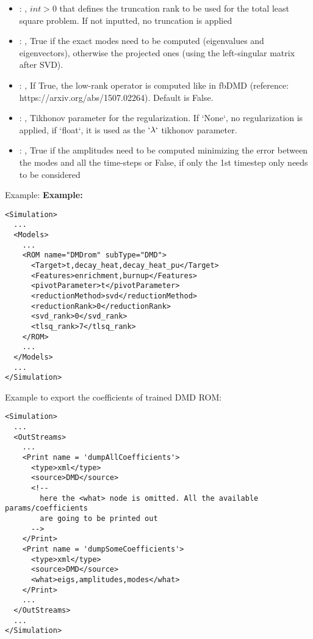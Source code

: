 \begin{itemize}
    \item {}: , 
      $int > 0$ that defines the truncation rank to be used for the total
      least square problem. If not inputted, no truncation is applied

    \item {}: , 
      True if the exact modes need to be computed (eigenvalues and
      eigenvectors),   otherwise the projected ones (using the left-singular matrix after SVD).

    \item {}: , 
      If True, the low-rank operator is computed like in fbDMD (reference:
      https://arxiv.org/abs/1507.02264).                                                  Default is
      False.

    \item {}: , 
      Tikhonov parameter for the regularization.                                                  If
      `None`, no regularization is applied, if `float`, it is used as the
      $`\lambda`$ tikhonov parameter.

    \item {}: , 
      True if the amplitudes need to be computed minimizing the error
      between the modes and all the time-steps or False, if only the 1st timestep only needs to be
      considered
  \end{itemize}

\hspace{24pt}
Example:
\textbf{Example:}
\begin{lstlisting}[style=XML,morekeywords={name,subType}]
<Simulation>
  ...
  <Models>
    ...
    <ROM name="DMDrom" subType="DMD">
      <Target>t,decay_heat,decay_heat_pu</Target>
      <Features>enrichment,burnup</Features>
      <pivotParameter>t</pivotParameter>
      <reductionMethod>svd</reductionMethod>
      <reductionRank>0</reductionRank>
      <svd_rank>0</svd_rank>
      <tlsq_rank>7</tlsq_rank>
    </ROM>
    ...
  </Models>
  ...
</Simulation>
\end{lstlisting}

Example to export the coefficients of trained DMD ROM:
\begin{lstlisting}[style=XML,morekeywords={name,subType}]
<Simulation>
  ...
  <OutStreams>
    ...
    <Print name = 'dumpAllCoefficients'>
      <type>xml</type>
      <source>DMD</source>
      <!--
        here the <what> node is omitted. All the available params/coefficients
        are going to be printed out
      -->
    </Print>
    <Print name = 'dumpSomeCoefficients'>
      <type>xml</type>
      <source>DMD</source>
      <what>eigs,amplitudes,modes</what>
    </Print>
    ...
  </OutStreams>
  ...
</Simulation>
\end{lstlisting}


